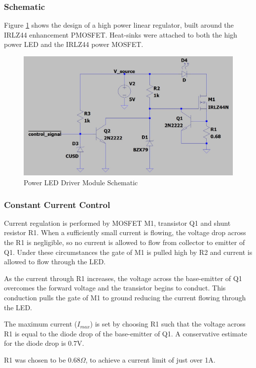 \subsubsection{Schematic}
Figure \ref{fig:schematic_power_led_driver} shows the design of a high power linear regulator, built around the IRLZ44 enhancement PMOSFET. Heat-sinks were attached to both the high power LED and the IRLZ44 power MOSFET.

\begin{figure}[H]
	\centering
	\includegraphics[width=.8\textwidth]{figures/design/power_led_driver.JPG}
	\caption{Power LED Driver Module Schematic}
	\label{fig:schematic_power_led_driver}
\end{figure}

\subsubsection{Constant Current Control}

Current regulation is performed by MOSFET M1, transistor Q1 and shunt resistor R1. When a sufficiently small current is flowing, the voltage drop across the R1 is negligible, so no current is allowed to flow from collector to emitter of Q1. Under these circumstances the gate of M1 is pulled high by R2 and current is allowed to flow through the LED.

As the current through R1 increases, the voltage across the base-emitter of Q1 overcomes the forward voltage and the transistor begins to conduct. This conduction pulls the gate of M1 to ground reducing the current flowing through the LED.

The maximum current ($I_{max}$) is set by choosing R1 such that the voltage across R1 is equal to the diode drop of the base-emitter of Q1. A conservative estimate for the diode drop is 0.7V.

R1 was chosen to be $0.68\Omega$, to achieve a current limit of just over 1A.


